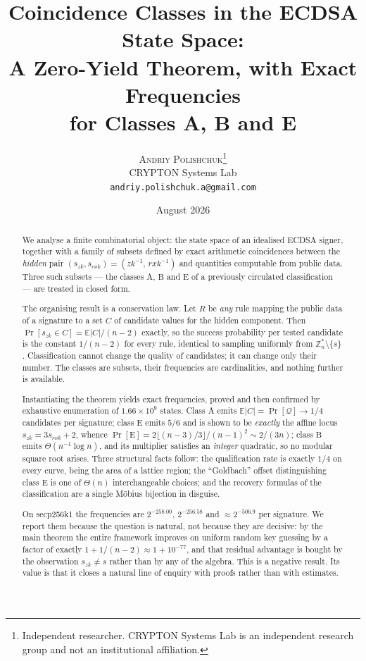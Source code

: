 \documentclass[11pt,a4paper]{article}
\title{\bfseries Coincidence Classes in the ECDSA State Space:\\[2pt]
A Zero-Yield Theorem, with Exact Frequencies\\ for Classes A, B and E}
\author{%
  \textsc{Andriy Polishchuk}\thanks{Independent researcher. CRYPTON Systems Lab is an
  independent research group and not an institutional affiliation.}\\[2pt]
  \small CRYPTON Systems Lab\\
  \small\texttt{andriy.polishchuk.a@gmail.com}
}
\date{August 2026}
\theoremstyle{plain}
\theoremstyle{definition}
\theoremstyle{remark}
\newcommand{\Zs}{\mathbb{Z}_n^{*}}
\newcommand{\Qu}{\mathcal{Q}}
\newcommand{\Ex}{\mathbb{E}}
\newcommand{\Pro}{\Pr}
\newcommand{\szk}{s_{zk}}
\newcommand{\srxk}{s_{rxk}}
\newcommand{\clA}{\mathrm{A}}
\newcommand{\clB}{\mathrm{B}}
\newcommand{\clE}{\mathrm{E}}
\begin{document}
\maketitle

\begin{abstract}
\noindent
We analyse a finite combinatorial object: the state space of an idealised ECDSA signer, together
with a family of subsets defined by exact arithmetic coincidences between the \emph{hidden} pair
$(\szk,\srxk) = (zk^{-1},\,rxk^{-1})$ and quantities computable from public data. Three such
subsets --- the classes $\clA$, $\clB$ and $\clE$ of a previously circulated
classification --- are treated in closed form.

The organising result is a conservation law. Let $R$ be \emph{any} rule mapping the public data of
a signature to a set $C$ of candidate values for the hidden component. Then
$\Pro[\szk \in C] = \Ex|C| / (n-2)$ exactly, so the success probability per tested candidate is the
constant $1/(n-2)$ for every rule, identical to sampling uniformly from $\Zs\setminus\{s\}$.
Classification cannot change the quality of candidates; it can change only their number. The
classes are subsets, their frequencies are cardinalities, and nothing further is available.

Instantiating the theorem yields exact frequencies, proved and then confirmed by exhaustive
enumeration of $1.66\times10^{9}$ states. Class $\clA$ emits $\Ex|C| = \Pro[\Qu] \to 1/4$
candidates per signature; class $\clE$ emits $5/6$ and is shown to be \emph{exactly} the affine
locus $\szk = 3\srxk + 2$, whence $\Pro[\clE] = 2\lfloor (n-3)/3\rfloor/(n-1)^{2} \sim 2/(3n)$;
class $\clB$ emits $\Theta(n^{-1}\log n)$, and its multiplier satisfies an \emph{integer}
quadratic, so no modular square root arises. Three structural facts follow: the qualification rate
is exactly $1/4$ on every curve, being the area of a lattice region; the ``Goldbach'' offset
distinguishing class $\clE$ is one of $\Theta(n)$ interchangeable choices; and the recovery
formulas of the classification are a single M\"obius bijection in disguise.

On secp256k1 the frequencies are $2^{-258.00}$, $2^{-256.58}$ and $\approx 2^{-506.9}$ per
signature. We report them because the question is natural, not because they are decisive: by the
main theorem the entire framework improves on uniform random key guessing by a factor of exactly
$1 + 1/(n-2) \approx 1 + 10^{-77}$, and that residual advantage is bought by the observation
$\szk \neq s$ rather than by any of the algebra. This is a negative result. Its value is that it
closes a natural line of enquiry with proofs rather than with estimates.
\end{abstract}
\end{document}
